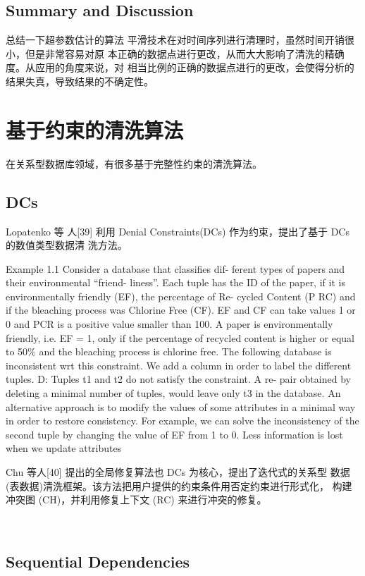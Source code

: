 \documentclass{article}
\begin{document}
\subsection{Summary and Discussion}
总结一下超参数估计的算法
平滑技术在对时间序列进行清理时，虽然时间开销很小，但是非常容易对原 本正确的数据点进行更改，从而大大影响了清洗的精确度。从应用的角度来说，对 相当比例的正确的数据点进行的更改，会使得分析的结果失真，导致结果的不确定性。


\section{基于约束的清洗算法}
在关系型数据库领域，有很多基于完整性约束的清洗算法。

\subsection{DCs}
Lopatenko 等 人[39] 利用 Denial Constraints(DCs) 作为约束，提出了基于 DCs 的数值类型数据清 洗方法。 
\par Example 1.1 Consider a database that classifies dif- ferent types of papers and their environmental “friend- liness”. Each tuple has the ID of the paper, if it is environmentally friendly (EF), the percentage of Re- cycled Content (P RC) and if the bleaching process was Chlorine Free (CF). EF and CF can take values 1 or 0 and PCR is a positive value smaller than 100. A paper is environmentally friendly, i.e. EF = 1, only if the percentage of recycled content is higher or equal to 50\% and the bleaching process is chlorine free. The following database is inconsistent wrt this constraint. We add a column in order to label the different tuples. D: 
Tuples t1 and t2 do not satisfy the constraint. A re- pair obtained by deleting a minimal number of tuples, would leave only t3 in the database. An alternative approach is to modify the values of some attributes in a minimal way in order to restore consistency. For example, we can solve the inconsistency of the second tuple by changing the value of EF from 1 to 0. Less information is lost when we update attributes 
 \par Chu 等人[40] 提出的全局修复算法也 DCs 为核心，提出了迭代式的关系型 数据(表数据)清洗框架。该方法把用户提供的约束条件用否定约束进行形式化， 构建冲突图 (CH)，并利用修复上下文 (RC) 来进行冲突的修复。

 \




\subsection{Sequential Dependencies}
\label{sect-SD}
\end{document}
